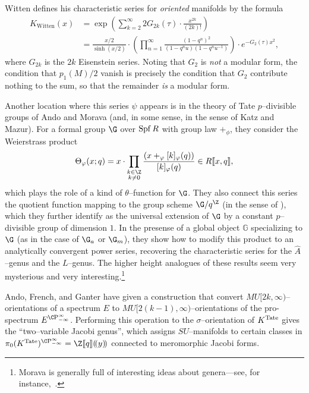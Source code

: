\begin{remark}
Witten defines his characteristic series for \emph{oriented} manifolds by the formula
\begin{align*}
K_{\mathrm{Witten}}(x) & = \exp\left( \sum_{k=2}^\infty 2 G_{2k}(\tau) \cdot \frac{x^{2k}}{(2k)!} \right) \\
& = \frac{x/2}{\sinh(x/2)} \cdot \left(\prod_{n=1}^\infty \frac{(1 - q^n)^2}{(1 - q^n u)(1 - q^n u^{-1})}\right) \cdot e^{-G_2(\tau) x^2},
\end{align*}
where $G_{2k}$ is the $2k${\th} Eisenstein series.  Noting that $G_2$ is \emph{not} a modular form, the condition that $p_1(M) / 2$ vanish is precisely the condition that $G_2$ contribute nothing to the sum, so that the remainder \emph{is} a modular form.
\end{remark}

\begin{remark}
Another location where this series $\psi$ appears is in the theory of Tate $p$--divisible groups of Ando and Morava (and, in some sense, in the sense of Katz and Mazur).  For a formal group $\G$ over $\operatorname{Spf} R$ with group law $+_\phi$, they consider the Weierstrass product \[\Theta_{\phi}(x; q) = x \cdot \prod_{\substack{k \in \Z \\ k \ne 0}} \frac{(x +_\phi [k]_\phi(q))}{[k]_\phi(q)} \in R\ps{x,q},\] which plays the role of a kind of $\theta$--function for $\G$.  They also connect this series the quotient function mapping to the group scheme $\G / q^{\Z}$ (in the sense of ), which they further identify as the universal extension of $\G$ by a constant $p$--divisible group of dimension $1$.  In the presense of a global object $\mathbb G$ specializing to $\G$ (as in the case of $\G_a$ or $\G_m$), they show how to modify this product to an analytically convergent power series, recovering the characteristic series for the $\widehat A$--genus and the $L$--genus.  The higher height analogues of these results seem very mysterious and very interesting.\footnote{Morava is generally full of interesting ideas about genera---see, for instance,~\cite{MoravaMotivicThomIso}.}
\end{remark}

\begin{remark}
Ando, French, and Ganter have given a construction that convert $MU[2k, \infty)$--orientations of a spectrum $E$ to $MU[2(k-1), \infty)$--orientations of the pro-spectrum $E^{\CP^\infty_{-\infty}}$.  Performing this operation to the $\sigma$--orientation of $K^{\mathrm{Tate}}$ gives the ``two--variable Jacobi genus'', which assigns $SU$--manifolds to certain classes in $\pi_0 (K^{\Tate})^{\CP^\infty_{-\infty}} = \Z\ps{q}(\!(y)\!)$ connected to meromorphic Jacobi forms.
\end{remark}













